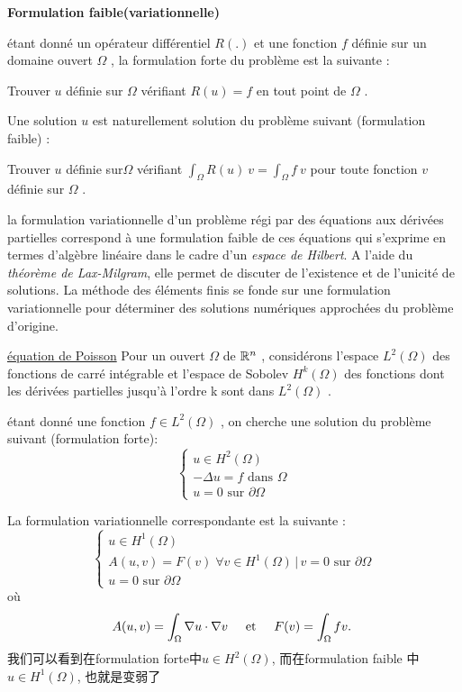 \documentclass[openany]{book}
\begin{document}
\textbf{Formulation faible(variationnelle)}

\'etant donn\'e un op\'erateur diff\'erentiel $ \displaystyle R(.) $ et une fonction $ \displaystyle f $ d\'efinie sur un domaine ouvert $ \Omega$ , la formulation forte du probl\`eme est la suivante :

Trouver $\displaystyle u$ d\'efinie sur $ \Omega$  v\'erifiant $ \displaystyle R(u)=f $ en tout point de $ \Omega$ .

Une solution $ \displaystyle u$  est naturellement solution du probl\`eme suivant (formulation faible) :

Trouver $ \displaystyle u$  d\'efinie sur$  \Omega $ v\'erifiant $ \int_\Omega R(u)\ v = \int_\Omega f\ v $ pour toute fonction $ \displaystyle v$  d\'efinie sur $ \Omega$ .

la formulation variationnelle d'un probl\`eme r\'egi par des \'equations aux d\'eriv\'ees partielles correspond \`a une formulation faible de ces \'equations qui s'exprime en termes d'alg\`ebre lin\'eaire dans le cadre d'un \emph{espace de Hilbert}. A l'aide du \emph{th\'eor\`eme de Lax-Milgram}, elle permet de discuter de l'existence et de l'unicit\'e de solutions. La m\'ethode des \'el\'ements finis se fonde sur une formulation variationnelle pour d\'eterminer des solutions num\'eriques approch\'ees du probl\`eme d'origine.

\underline{\'equation de Poisson}\newline
Pour un ouvert $ \Omega$  de $ \mathbb{R}^n$ , consid\'erons l'espace $ L^2(\Omega) $ des fonctions de carr\'e int\'egrable et l'espace de Sobolev $ H^k(\Omega)$  des fonctions dont les d\'eriv\'ees partielles jusqu'\`a l'ordre k sont dans $ L^2(\Omega)$ .

\'etant donn\'e une fonction $ f \in L^2(\Omega)$ , on cherche une solution du probl\`eme suivant (formulation forte):
\begin{equation}
    \begin{cases} u \in H^2(\Omega) \\ -\Delta u = f \text{ dans } \Omega \\ u = 0 \text{ sur } \partial\Omega \end{cases}
\end{equation}

La formulation variationnelle correspondante est la suivante :
\begin{equation}
    \begin{cases} u \in H^1(\Omega) \\ A(u,v) = F(v) \; \forall v \in H^1(\Omega) \, | \, v = 0 \text{ sur } \partial\Omega \\ u = 0 \text{ sur } \partial\Omega \end{cases}
\end{equation}
où
$$
A(u,v) = \int_\Omega \nabla u \cdot \nabla v \hspace{0.5cm} \text{et} \hspace{0.5cm} F(v) = \int_\Omega fv.~
$$
我们可以看到在formulation forte中$u \in H^2(\Omega)$, 而在formulation faible 中$u \in H^1(\Omega)$, 也就是变弱了
\end{document}
